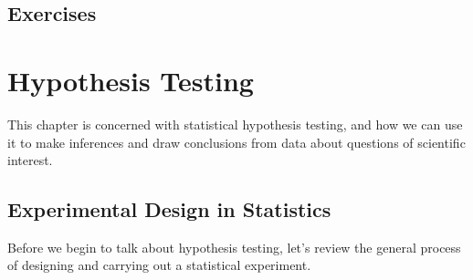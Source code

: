 \documentclass[twoside]{book}\usepackage[]{graphicx}\usepackage[]{xcolor}
\newif\ifsolutions
\newif\ifsolutionslocal
\begin{document}
\newpage
\section*{Exercises}
\shipoutProblems


\ifsolutions
\ifsolutionslocal
\newpage
\section*{Solutions}
\shipoutSolutions
\fi
\fi
 



\chapter{Hypothesis Testing}

This chapter is concerned with statistical hypothesis testing, and how we can use it to make inferences and draw conclusions from data about questions of scientific interest.

\section{Experimental Design in Statistics}
Before we begin to talk about hypothesis testing, let's review the general process of designing and carrying out a statistical experiment.
\end{document}
